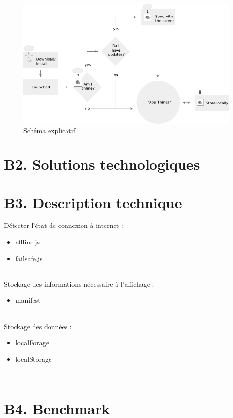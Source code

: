  \begin{figure}[h!]
  \centering
  \includegraphics[width=18cm]{./images/schema.png}
  \caption{Schéma explicatif}
  \label{schema}
 \end{figure}

\section{B2. Solutions technologiques}

\section{B3. Description technique}

Détecter l'état de connexion à internet :
	\begin{itemize}
		\item offline.js
		\item failsafe.js
	\end{itemize}
	~\\

Stockage des informations nécessaire à l’affichage :
	\begin{itemize}
		\item manifest
	\end{itemize}
	~\\
	
Stockage des données :
	\begin{itemize}
		\item localForage
		\item localStorage
	\end{itemize}
	~\\

\section{B4. Benchmark}

